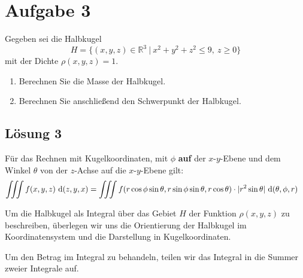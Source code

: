 \documentclass[main.tex]{subfiles}
\begin{document}
\section{Aufgabe 3}
Gegeben sei die Halbkugel
\[
    H = \{ (x,y,z) \in \mathbb{R}^3 \ | \ x^2 + y^2 + z^2 \leq 9, \ z \geq 0 \}
\]
mit der Dichte $\rho(x, y, z) = 1$.
\begin{enumerate}
    \item Berechnen Sie die Masse der Halbkugel.
    \item Berechnen Sie anschließend den Schwerpunkt der Halbkugel.
\end{enumerate}

\subsection{Lösung 3}
Für das Rechnen mit Kugelkoordinaten, mit $\phi$ \textbf{auf} der $x$-$y$-Ebene und 
dem Winkel $\theta$ von der $z$-Achse auf die $x$-$y$-Ebene gilt:
\begin{align*}
    \iiint f(x,y,z) ~\mathrm{d}(z,y,x) &= 
        \iiint f(r\cos\phi\sin\theta, r\sin\phi\sin\theta, r\cos\theta )\cdot |r^2\sin\theta| ~\mathrm{d}(\theta, \phi, r)
\end{align*}

Um die Halbkugel als Integral über das Gebiet $H$ der Funktion $\rho(x, y, z)$ zu beschreiben, überlegen wir uns die Orientierung
der Halbkugel im Koordinatensystem und die Darstellung in Kugelkoordinaten.

Um den Betrag im Integral zu behandeln, teilen wir das Integral in die Summer zweier Integrale auf.
\end{document}
